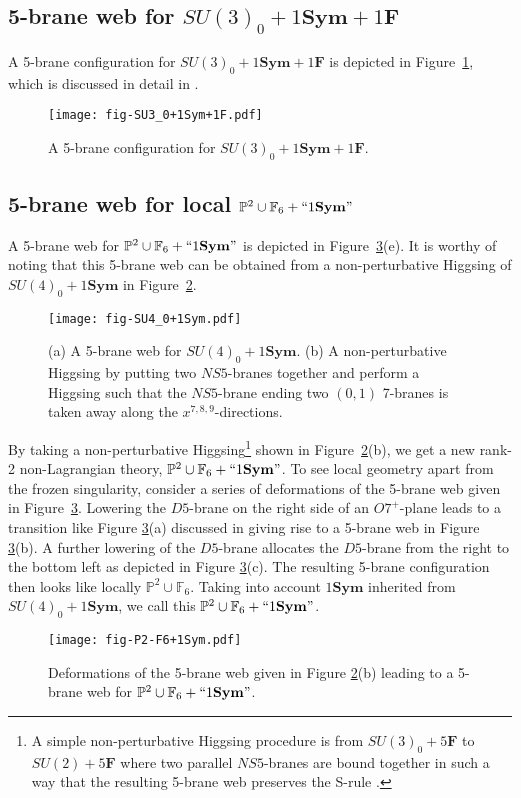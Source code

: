 \subsection{5-brane web for \texorpdfstring{$SU(3)_{0}+1\mathbf{Sym}+1\mathbf{F}$}{SU(3)0 + 1Sym + 1F}}
A 5-brane configuration for $SU(3)_{0}+1\mathbf{Sym}+1\mathbf{F}$ is depicted in Figure~\ref{fig:SU3_0+1Sym+1F}, which is discussed in detail in \cite{Hayashi:2018lyv}.
\begin{figure}[t]
\texttt{[image: fig-SU3\_0+1Sym+1F.pdf]}
\centering	
\caption{A 5-brane configuration for $SU(3)_0+1\mathbf{Sym}+1\mathbf{F}$.}
\label{fig:SU3_0+1Sym+1F}
\end{figure}


\subsection{5-brane web for \texorpdfstring{local $\mathbb{P}^2\cup \mathbb{F}_6 +``1\mathbf{Sym}"$}{P2 U F6 + 1Sym}}\label{sec:app-P^2F_6+1Sym}

A 5-brane web for $\mathbb{P}^2\cup \mathbb{F}_6 +``1\mathbf{Sym}"$ is depicted in Figure~\ref{fig:P2-F6+1Sym}(e). It is worthy of noting that this 5-brane web can be obtained from a non-perturbative Higgsing of $SU(4)_0+1\mathbf{Sym}$ in Figure~\ref{fig:SU4_0+1Sym}.
\begin{figure}
	\texttt{[image: fig-SU4\_0+1Sym.pdf]}
	\centering	
	\caption{(a) A 5-brane web for $SU(4)_0+1\mathbf{Sym}$. (b) A non-perturbative Higgsing by putting two $NS5$-branes together and perform a Higgsing such that the $NS5$-brane ending two $(0,1)$ 7-branes is taken away along the $x^{7,8,9}$-directions.}
	\label{fig:SU4_0+1Sym}
\end{figure}
By taking a non-perturbative Higgsing\footnote{A simple non-perturbative Higgsing procedure is from $SU(3)_0+5\mathbf{F}$ to $SU(2)+5\mathbf{F}$ where two parallel $NS5$-branes are bound together in such a way that the resulting 5-brane web preserves the S-rule \cite{Hayashi:2013qwa, Kim:2014nqa}.} shown in Figure~\ref{fig:SU4_0+1Sym}(b), we get a new rank-2 non-Lagrangian theory, $\mathbb{P}^2\cup \mathbb{F}_6 +``1\mathbf{Sym}"$. To see local geometry apart from the frozen singularity, consider a series of deformations of the 5-brane web given in Figure~\ref{fig:P2-F6+1Sym}. 
Lowering the $D5$-brane on the right side of an $O7^+$-plane leads to a transition like Figure \ref{fig:P2-F6+1Sym}(a) discussed in \cite{Hayashi:2017btw} giving rise to a 5-brane web in Figure \ref{fig:P2-F6+1Sym}(b). A further lowering of the $D5$-brane allocates the $D5$-brane from the right to the bottom left as depicted in Figure \ref{fig:P2-F6+1Sym}(c). The resulting 5-brane configuration then looks like locally $\mathbb{P}^2\cup \mathbb{F}_6$. Taking into account $1\mathbf{Sym}$ inherited from $SU(4)_0+1\mathbf{Sym}$, we call this $ \mathbb{P}^2\cup \mathbb{F}_6 +``1\mathbf{Sym}"$.
\begin{figure}
	\texttt{[image: fig-P2-F6+1Sym.pdf]}
	\centering	
	\caption{Deformations of the 5-brane web given in Figure \ref{fig:SU4_0+1Sym}(b) leading to a 5-brane web for $\mathbb{P}^2\cup \mathbb{F}_6 +``1\mathbf{Sym}"$.}
	\label{fig:P2-F6+1Sym}
\end{figure}

